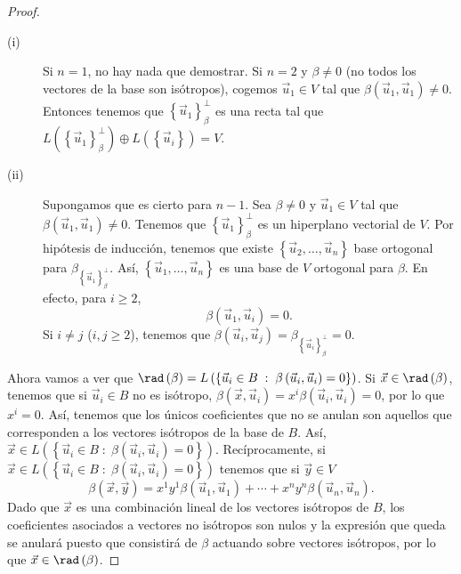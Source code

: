 \begin{proof}
	\begin{description}
	\item[(i)] Si $\displaystyle n = 1 $, no hay nada que demostrar. Si $\displaystyle n = 2 $ y $\displaystyle \beta \neq 0 $ (no todos los vectores de la base son isótropos), cogemos $\displaystyle \vec{u}_{1} \in V $ tal que $\displaystyle \beta\left(\vec{u}_{1}, \vec{u}_{1}\right) \neq 0 $. Entonces tenemos que $\displaystyle \left\{ \vec{u}_{1}\right\} ^{\perp }_{\beta}$ es una recta tal que $\displaystyle L\left( \left\{ \vec{u}_{1}\right\} ^{\perp }_{\beta }\right)\oplus L\left( \left\{ \vec{u}_{i}\right\} \right) = V $.
	\item[(ii)] Supongamos que es cierto para $\displaystyle n - 1 $. Sea $\displaystyle \beta \neq 0 $ y $\displaystyle \vec{u}_{1} \in V $ tal que $\displaystyle \beta\left(\vec{u}_{1}, \vec{u}_{1}\right) \neq 0 $. Tenemos que $\displaystyle \left\{ \vec{u}_{1}\right\} ^{\perp }_{\beta } $ es un hiperplano vectorial de $\displaystyle V $. Por hipótesis de inducción, tenemos que existe $\displaystyle \left\{ \vec{u}_{2}, \ldots, \vec{u}_{n}\right\}  $ base ortogonal para $\displaystyle \beta_{ \left\{ \vec{u}_{1}\right\} ^{\perp }_\beta} $.
		Así, $\displaystyle \left\{ \vec{u}_{1}, \ldots, \vec{u}_{n}\right\}  $ es una base de $\displaystyle V $ ortogonal para $\displaystyle \beta  $. En efecto, para $\displaystyle i \geq 2 $,
		\[\beta\left(\vec{u}_{1}, \vec{u}_{i}\right) = 0 .\]
		Si $\displaystyle i \neq j$ ($\displaystyle i,j \geq 2 $), tenemos que $\displaystyle \beta\left(\vec{u}_{i}, \vec{u}_{j}\right) = \beta_{ \left\{ \vec{u}_{i}\right\} ^{\perp }_{\beta }} = 0 $.	
	\end{description} 
	Ahora vamos a ver que $\displaystyle \rad\left(\beta \right)= L\left( \left\{ \vec{u}_{i} \in B \; : \; \beta\left(\vec{u}_{i}, \vec{u}_{i}\right)=0\right\} \right) $. Si $\displaystyle \vec{x} \in \rad\left(\beta \right) $, tenemos que si $\displaystyle \vec{u}_{i} \in B $ no es isótropo, $\displaystyle \beta\left(\vec{x}, \vec{u}_{i}\right) = x^{i}\beta\left(\vec{u}_{i}, \vec{u}_{i}\right) = 0 $, por lo que $\displaystyle x^{i} = 0$.
	Así, tenemos que los únicos coeficientes que no se anulan son aquellos que corresponden a los vectores isótropos de la base de $\displaystyle B $. Así, $\displaystyle \vec{x} \in L\left( \left\{ \vec{u}_{i} \in B \; : \; \beta\left(\vec{u}_{i}, \vec{u}_{i}\right) = 0\right\} \right) $. Recíprocamente, si $\displaystyle \vec{x} \in L\left( \left\{ \vec{u}_{i} \in B \; : \; \beta\left(\vec{u}_{i}, \vec{u}_{i}\right) = 0\right\} \right) $ tenemos que si $\displaystyle \vec{y} \in V $ 
	\[\beta\left(\vec{x},\vec{y}\right) = x^{1}y^{1}\beta\left(\vec{u}_{1},\vec{u}_{1}\right) + \cdots + x^{n}y^{n}\beta\left(\vec{u}_{n}, \vec{u}_{n}\right) .\]
	Dado que $\displaystyle \vec{x} $ es una combinación lineal de los vectores isótropos de $\displaystyle B $, los coeficientes asociados a vectores no isótropos son nulos y la expresión que queda se anulará puesto que consistirá de $\displaystyle \beta  $ actuando sobre vectores isótropos, por lo que $\displaystyle \vec{x } \in \rad\left(\beta \right) $.
\end{proof}
